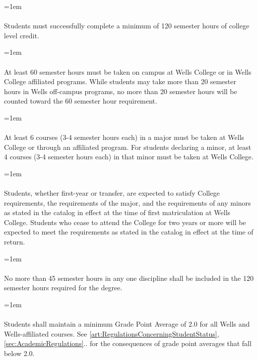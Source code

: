 \documentclass{manual}
\let\oldparagraph\paragraph
\renewcommand\paragraph{\leftskip=1em\oldparagraph}
\begin{document}
\paragraph{} Students must successfully complete a minimum of 120 semester hours of college level credit.

\paragraph{} At least 60 semester hours must be taken on campus at Wells College or in Wells College affiliated programs. While students may take more than 20 semester hours in Wells off-campus programs, no more than 20 semester hours will be counted toward the 60 semester hour requirement.

\paragraph{} At least 6 courses (3-4 semester hours each) in a major must be taken at Wells College or through an affiliated program. For students declaring a minor, at least 4 courses (3-4 semester hours each) in that minor must be taken at Wells College.

\paragraph{} Students, whether first-year or transfer, are expected to satisfy College requirements, the requirements of the major, and the requirements  of any minors as stated in the catalog in effect at the time of first matriculation at Wells College. Students who cease to attend the College for two years or more will be expected to meet the requirements as stated in the catalog in effect at the time of return.

\paragraph{} No more than 45 semester hours in any one discipline shall be included   in the 120 semester hours required for the degree.

\paragraph{} Students shall maintain a minimum Grade Point Average of 2.0 for all Wells and Wells-affiliated courses. See \cref{art:RegulationsConcerningStudentStatus}, \cref{sec:AcademicRegulations}.. for the consequences of grade point averages that fall below 2.0.
\end{document}
